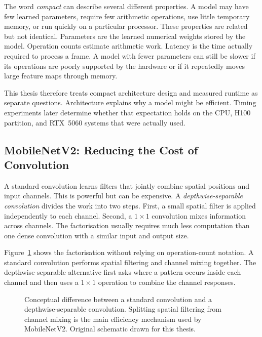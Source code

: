 The word \emph{compact} can describe several different properties. A model may
have few learned parameters, require few arithmetic operations, use little
temporary memory, or run quickly on a particular processor. These properties
are related but not identical. Parameters are the learned numerical weights
stored by the model. Operation counts estimate arithmetic work. Latency is the
time actually required to process a frame. A model with fewer parameters can
still be slower if its operations are poorly supported by the hardware or if
it repeatedly moves large feature maps through memory.

This thesis therefore treats compact architecture design and measured runtime
as separate questions. Architecture explains why a model might be efficient.
Timing experiments later determine whether that expectation holds on the CPU,
H100 partition, and RTX~5060 systems that were actually used.

\subsection{MobileNetV2: Reducing the Cost of Convolution}

A standard convolution learns filters that jointly combine spatial positions
and input channels. This is powerful but can be expensive. A
\emph{depthwise-separable convolution} divides the work into two steps. First,
a small spatial filter is applied independently to each channel. Second, a
$1\times1$ convolution mixes information across channels. The factorisation
usually requires much less computation than one dense convolution with a
similar input and output size.

Figure~\ref{fig:depthwise_convolution} shows the factorisation without relying
on operation-count notation. A standard convolution performs spatial filtering
and channel mixing together. The depthwise-separable alternative first asks
where a pattern occurs inside each channel and then uses a $1\times1$ operation
to combine the channel responses.

\begin{figure}[H]
\centering
\resizebox{\textwidth}{!}{}
\caption[Standard and depthwise-separable convolution.]{Conceptual difference
between a standard convolution and a depthwise-separable convolution. Splitting
spatial filtering from channel mixing is the main efficiency mechanism used by
MobileNetV2. Original schematic drawn for this thesis.}
\label{fig:depthwise_convolution}
\end{figure}

